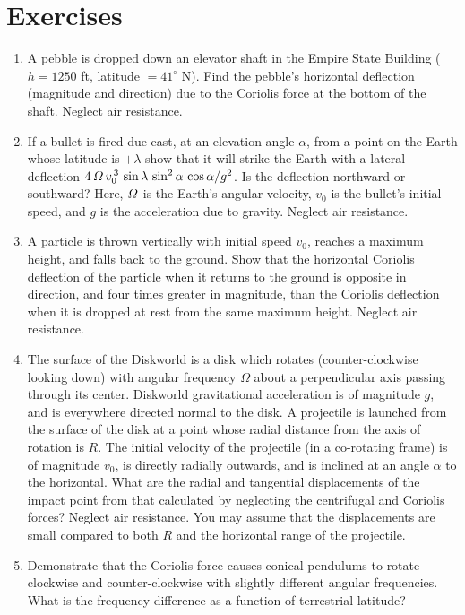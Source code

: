 \section{Exercises}
{\small 
\renewcommand{\theenumi}{7.\arabic{enumi}}
\begin{enumerate}
\item A pebble is dropped down an elevator shaft in the Empire State
Building ($h=1250$ ft, latitude $=41^\circ$ N). Find the pebble's horizontal deflection (magnitude and direction) 
due to the Coriolis force at the bottom of the shaft. Neglect air resistance.

\item If a bullet is fired due east, at an elevation angle $\alpha$, from a point
on the Earth whose latitude is $+\lambda$ show that it will strike the
Earth with a lateral deflection $4\,{\mit\Omega}\,v_0^{\,3}\,\sin\lambda\,\sin^2\alpha\,\cos\alpha/g^2$.
Is the deflection northward or southward?
Here, ${\mit\Omega}$ is the Earth's angular velocity, $v_0$ is the bullet's initial speed, and
$g$ is the acceleration due to gravity. Neglect air resistance.

\item A particle is thrown vertically with initial speed $v_0$, reaches
a maximum height, and falls back to the ground. Show that the horizontal Coriolis
deflection of the particle when it returns to the ground is opposite in direction,
and four times greater in magnitude, than the Coriolis deflection when it
is dropped at rest from the same maximum height. Neglect air resistance.

\item The surface of the Diskworld is a disk which
rotates (counter-clockwise looking down) with angular frequency $\Omega$ about a perpendicular axis passing through
its center. Diskworld gravitational acceleration is of magnitude
$g$, and is everywhere directed normal to the disk.
A projectile is launched from the surface of the disk at a point whose radial distance from the axis of rotation is $R$.
The initial velocity of the projectile (in a co-rotating frame) is of magnitude $v_0$,  is directly radially
outwards, and is inclined at an angle  $\alpha$ to the horizontal. 
What are the radial and tangential displacements of the impact point
from that calculated by neglecting the centrifugal and Coriolis forces?
Neglect air resistance. You may assume that the displacements are small
compared to both $R$ and the horizontal range of the projectile. 

\item Demonstrate that the Coriolis force causes conical pendulums to
rotate clockwise and counter-clockwise with slightly different angular frequencies. What
is the frequency difference as a function of terrestrial latitude?


\end{enumerate}}
